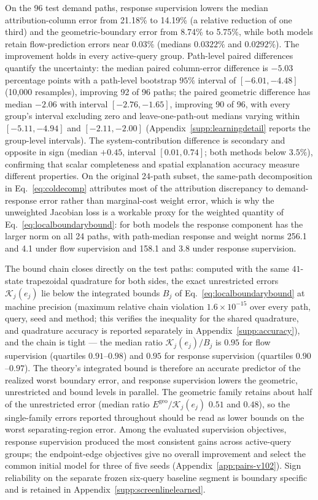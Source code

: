 On the 96 test demand paths, response supervision lowers the median
attribution-column error from 21.18\% to 14.19\% (a relative reduction
of one third) and the geometric-boundary error from 8.74\% to 5.75\%,
while both models retain flow-prediction errors near $0.03\%$ (medians
$0.0322\%$ and $0.0292\%$). The improvement holds in every
active-query group. Path-level paired differences quantify the
uncertainty: the median paired column-error difference is $-5.03$
percentage points with a path-level bootstrap $95\%$ interval of
$[-6.01,-4.48]$ (10,000 resamples), improving 92 of 96 paths; the
paired geometric difference has median $-2.06$ with interval
$[-2.76,-1.65]$, improving 90 of 96, with every group's interval
excluding zero and leave-one-path-out medians varying within
$[-5.11,-4.94]$ and $[-2.11,-2.00]$
(Appendix~\ref{supp:learningdetail} reports the group-level intervals).
The system-contribution difference is secondary and opposite in sign
(median $+0.45$, interval $[0.01,0.74]$; both methods below $3.5\%$),
confirming that scalar completeness and spatial explanation accuracy
measure different properties. On the original 24-path subset, the
same-path decomposition in Eq.~\eqref{eq:coldecomp} attributes most of
the attribution discrepancy to demand-response error rather than
marginal-cost weight error, which is why the unweighted Jacobian loss
is a workable proxy for the weighted quantity of
Eq.~\eqref{eq:localboundarybound}: for both models the response
component has the larger norm on all 24 paths, with path-median
response and weight norms 256.1 and 4.1 under flow supervision and
158.1 and 3.8 under response supervision.

The bound chain closes directly on the test paths: computed with the
same $41$-state trapezoidal quadrature for both sides, the exact
unrestricted errors $\mathcal K_j(e_j)$ lie below the integrated
bounds $B_j$ of Eq.~\eqref{eq:localboundarybound} at machine precision
(maximum relative chain violation $1.6\times10^{-15}$ over every
path, query, seed and method; this verifies the inequality for the
shared quadrature, and quadrature accuracy is reported separately in
Appendix~\ref{supp:accuracy}), and the chain is tight --- the median
ratio $\mathcal K_j(e_j)/B_j$ is $0.95$ for flow supervision (quartiles
$0.91$--$0.98$) and $0.95$ for response supervision (quartiles
$0.90$--$0.97$). The theory's integrated bound is therefore an
accurate predictor of the realized worst boundary error, and response
supervision lowers the geometric, unrestricted and bound levels in
parallel. The geometric family retains about half of the unrestricted
error (median ratio $E^{\mathrm{geo}}/\mathcal K_j(e_j)$ $0.51$ and
$0.48$), so the single-family errors reported throughout should be
read as lower bounds on the worst separating-region error.
Among the evaluated supervision objectives, response supervision
produced the most consistent gains across active-query groups; the
endpoint-edge objectives give no overall improvement and select the
common initial model for three of five seeds
(Appendix~\ref{app:pairs-v102}). Sign reliability on the separate
frozen six-query baseline segment is boundary specific and is retained
in Appendix~\ref{supp:screenlinelearned}.
